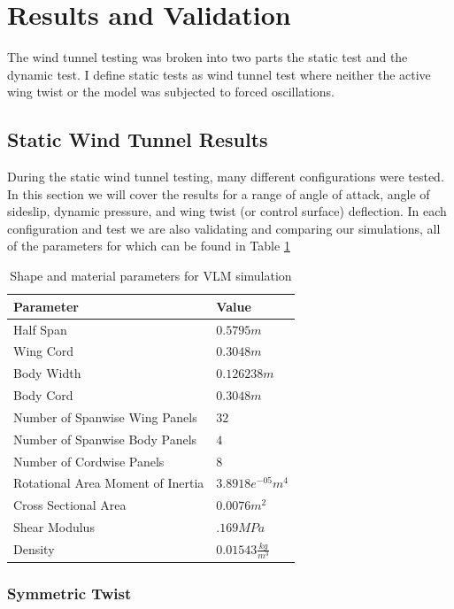 \documentclass[11pt]{ucthesis}
\begin{document}
\section{Results and Validation}
The wind tunnel testing was broken into two parts the static test and the dynamic test. I define static tests as wind tunnel test where neither the active wing twist or the model was subjected to forced oscillations. 
\subsection{Static Wind Tunnel Results}
During the static wind tunnel testing, many different configurations were tested. In this section we will cover the results for a range of angle of attack, angle of sideslip, dynamic pressure, and wing twist (or control surface) deflection. In each configuration and test we are also validating and comparing our simulations, all of the parameters for which can be found in Table \ref{tab:vlmConfig}

\begin{table}[h]
\begin{center}
\caption{Shape and material parameters for VLM simulation}
\label{tab:vlmConfig}
\begin{tabular}{  p{6cm} p{1.9cm}}
Parameter&Value\\\hline
Half Span&$0.5795m$\\
Wing Cord&$0.3048m$\\
Body Width&$0.126238m$\\
Body Cord&$0.3048m$\\
Number of Spanwise Wing Panels&$32$\\
Number of Spanwise Body Panels&$4$\\
Number of Cordwise Panels&$8$\\
Rotational Area Moment of Inertia&$3.8918e^{-05}m^4$\\
Cross Sectional Area&$0.0076m^2$\\
Shear Modulus&$.169 MPa$\\
Density&$0.01543\frac{kg}{m^3}$\\
\end{tabular}
\end{center}
\end{table}  

\subsubsection{Symmetric Twist}
\end{document}
